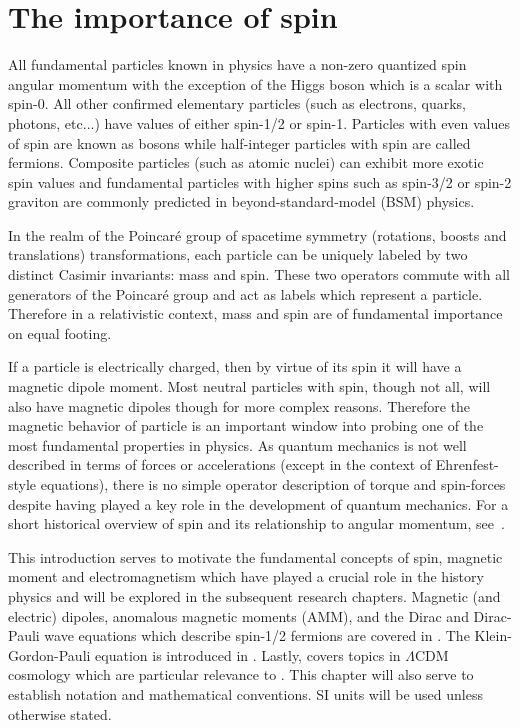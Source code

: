 \chapter{The importance of spin}
\label{chap:intro}
\noindent All fundamental particles known in physics have a non-zero quantized spin angular momentum with the exception of the Higgs boson which is a scalar with spin-0. All other confirmed elementary particles (such as electrons, quarks, photons, etc...) have values of either spin-1/2 or spin-1. Particles with even values of spin are known as bosons while half-integer particles with spin are called fermions. Composite particles (such as atomic nuclei) can exhibit more exotic spin values and fundamental particles with higher spins such as spin-3/2 or spin-2 graviton are commonly predicted in beyond-standard-model (BSM) physics.

In the realm of the Poincar{\'e} group of spacetime symmetry (rotations, boosts and translations) transformations, each particle can be uniquely labeled by two distinct Casimir invariants: mass and spin. These two operators commute with all generators of the Poincar{\'e} group and act as labels which represent a particle. Therefore in a relativistic context, mass and spin are of fundamental importance on equal footing.

If a particle is electrically charged, then by virtue of its spin it will have a magnetic dipole moment. Most neutral particles with spin, though not all, will also have magnetic dipoles though for more complex reasons. Therefore the magnetic behavior of particle is an important window into probing one of the most fundamental properties in physics. As quantum mechanics is not well described in terms of forces or accelerations (except in the context of Ehrenfest-style equations), there is no simple operator description of torque and spin-forces despite having played a key role in the development of quantum mechanics. For a short historical overview of spin and its relationship to angular momentum, see~\cite{Ohanian:1986wg}.

This introduction serves to motivate the fundamental concepts of spin, magnetic moment and electromagnetism which have played a crucial role in the history physics and will be explored in the subsequent research chapters. Magnetic (and electric) dipoles, anomalous magnetic moments (AMM), and the Dirac and Dirac-Pauli wave equations which describe spin-1/2 fermions are covered in . The Klein-Gordon-Pauli equation is introduced in . Lastly,  covers topics in $\Lambda\mathrm{CDM}$ cosmology which are particular relevance to . This chapter will also serve to establish notation and mathematical conventions. SI units will be used unless otherwise stated.

